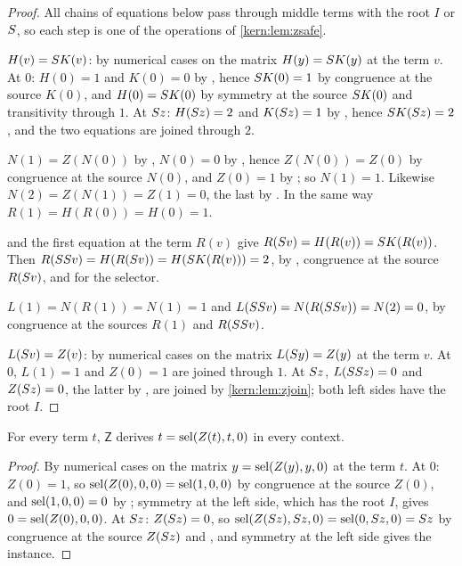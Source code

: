 \begin{proof}
All chains of equations below pass through middle terms with the root $I$ or
$S$, so each step is one of the operations of \cref{kern:lem:zsafe}.

$H(v)=S K(v)$: by numerical cases on the matrix $H(y)=S K(y)$ at the
term $v$.  At $0$: $H(0)=1$ and $K(0)=0$ by , hence
$S K(0)=1$ by congruence at the source $K(0)$, and $H(0)=S K(0)$ by
symmetry at the source $S K(0)$ and transitivity through $1$.  At
$S z$: $H(S z)=2$ and $K(S z)=1$ by , hence
$S K(S z)=2$, and the two equations are joined through $2$.

$N(1)=Z(N(0))$ by , $N(0)=0$ by , hence
$Z(N(0))=Z(0)$ by congruence at the source $N(0)$, and $Z(0)=1$ by
; so $N(1)=1$.  Likewise $N(2)=Z(N(1))=Z(1)=0$, the last by
.  In the same way $R(1)=H(R(0))=H(0)=1$.

 and the first equation at the term $R(v)$ give
$R(S v)=H(R(v))=S K(R(v))$.  Then
$R(SS v)=H(R(S v))=H(S K(R(v)))=2$, by , congruence
at the source $R(S v)$, and  for the selector.

$L(1)=N(R(1))=N(1)=1$ and $L(SS v)=N(R(SS v))=N(2)=0$, by
congruence at the sources $R(1)$ and $R(SS v)$.

$L(S v)=Z(v)$: by numerical cases on the matrix $L(S y)=Z(y)$ at the
term $v$.  At $0$, $L(1)=1$ and $Z(0)=1$ are joined through $1$.  At
$S z$, $L(SS z)=0$ and $Z(S z)=0$, the latter by ,
are joined by \cref{kern:lem:zjoin}; both left sides have the root $I$.
\end{proof}

\begin{lemma}[Filter]
\label{kern:lem:zfilter}
For every term $t$, $\mathsf{Z}$ derives $t=\operatorname{sel}(Z(t),t,0)$ in every context.
\end{lemma}

\begin{proof}
By numerical cases on the matrix $y=\operatorname{sel}(Z(y),y,0)$ at the term $t$.  At
$0$: $Z(0)=1$, so $\operatorname{sel}(Z(0),0,0)=\operatorname{sel}(1,0,0)$ by congruence at the source
$Z(0)$, and $\operatorname{sel}(1,0,0)=0$ by ; symmetry at the left side,
which has the root $I$, gives $0=\operatorname{sel}(Z(0),0,0)$.  At $S z$:
$Z(S z)=0$, so $\operatorname{sel}(Z(S z),S z,0)=\operatorname{sel}(0,S z,0)=S z$ by
congruence at the source $Z(S z)$ and , and symmetry at the
left side gives the instance.
\end{proof}

